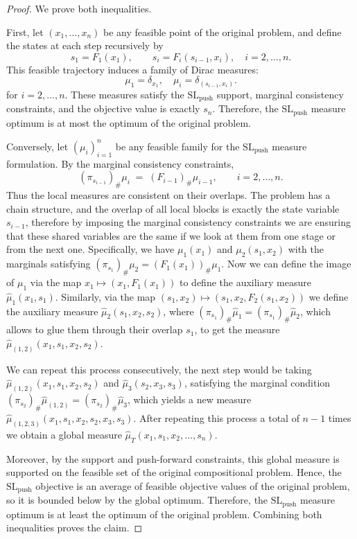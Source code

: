 \documentclass[11pt,a4paper]{article}
\theoremstyle{definition}
\begin{document}
\begin{proof}
We prove both inequalities.

First, let $(x_1,\dots,x_n)$ be any feasible point of the original problem, and define the states at each step recursively by
\[
s_1=F_1(x_1), \qquad s_i=F_i(s_{i-1},x_i), \quad i=2,\dots,n.
\]
This feasible trajectory induces a family of Dirac measures:
\[
\mu_1=\delta_{x_1}, \quad \mu_i=\delta_{(s_{i-1},x_i)}.
\]
for $i=2,\dots, n$. These measures satisfy the $\mathrm{SL}_{\mathrm{push}}$ support, marginal consistency constraints, and the objective value is exactly $s_n$. Therefore, the $\mathrm{SL}_{\mathrm{push}}$ measure optimum is at most the optimum of the original problem.

Conversely, let $(\mu_i)_{i=1}^n$ be any feasible family for the $\mathrm{SL}_{\mathrm{push}}$ measure formulation. By the marginal consistency constraints,
\[
(\pi_{s_{i-1}})_\#\mu_i\;=\; (F_{i-1})_{\#}\mu_{i-1}, \qquad i=2,\dots,n.
\]
Thus the local measures are consistent on their overlaps. The problem has a chain structure, and the overlap of all local blocks is exactly the state variable $s_{i-1}$, therefore by imposing the marginal consistency constraints we are ensuring that these shared variables are the same if we look at them from one stage or from the next one. Specifically, we have $\mu_1(x_1)$ and $\mu_2(s_1,x_2)$ with the marginals satisfying $(\pi_{s_{1}})_\#\mu_2= (F_{1}(x_1))_{\#}\mu_{1}$. Now we can define the image of $\mu_1$ via the map $x_1\mapsto (x_1,F_1(x_1))$ to define the auxiliary measure $\hat{\mu}_1(x_1,s_1)$. Similarly, via the map $(s_1,x_2)\mapsto (s_1,x_2,F_2(s_1,x_2))$ we define the auxiliary measure $\hat{\mu}_2(s_1,x_2,s_2)$, where $(\pi_{s_{1}})_\#\hat{\mu}_1= (\pi_{s_{1}})_\#\hat{\mu}_2$, which allows to glue them through their overlap $s_1$, to get the measure $\hat{\mu}_{(1,2)}(x_1,s_1,x_2,s_2)$. 


We can repeat this process consecutively, the next step would be taking $\hat{\mu}_{(1,2)}(x_1,s_1,x_2,s_2)$ and $\hat{\mu}_3(s_2,x_3,s_3)$, satisfying the marginal condition $(\pi_{s_{2}})_\#\hat{\mu}_{(1,2)}= (\pi_{s_{2}})_\#\hat{\mu}_3$, which yields a new measure $\hat{\mu}_{(1,2,3)}(x_1,s_1,x_2,s_2,x_3,s_3)$. After repeating this process a total of $n-1$ times we obtain a global measure $\hat{\mu}_T(x_1,s_1,x_2,\dots,s_n)$.


Moreover, by the support and push-forward constraints, this global measure is supported on the feasible set of the original compositional problem. Hence, the $\mathrm{SL}_{\mathrm{push}}$ objective is an average of feasible objective values of the original problem, so it is bounded below by the global optimum. Therefore, the $\mathrm{SL}_{\mathrm{push}}$ measure optimum is at least the optimum of the original problem. Combining both inequalities proves the claim.
\end{proof}
\end{document}

